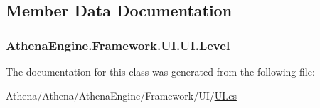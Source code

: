 \subsection{Member Data Documentation}
\hypertarget{class_athena_engine_1_1_framework_1_1_u_i_1_1_u_i_a674662599558fe8d717176488b8fe98b}{
\subsubsection[{Level}]{ Athena\-Engine.\-Framework.\-U\-I.\-U\-I.\-Level}}\label{class_athena_engine_1_1_framework_1_1_u_i_1_1_u_i_a674662599558fe8d717176488b8fe98b}


The documentation for this class was generated from the following file\-:\begin{DoxyCompactItemize}
\item 
Athena/\-Athena/\-Athena\-Engine/\-Framework/\-U\-I/\hyperlink{_u_i_8cs}{U\-I.\-cs}\end{DoxyCompactItemize}
